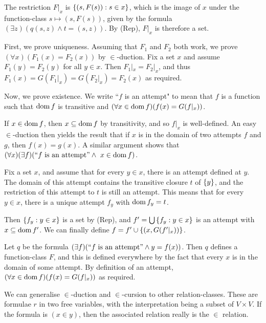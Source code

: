\documentclass{article}
\begin{document}
\begin{prf}
    The restriction $F|_x$ is $\left\lbrace (s, F(s)) : s \in x \right\rbrace$, which is the image of $x$ under the function-class $s \mapsto (s, F(s))$, given by the formula $(\exists z)(q(s, z) \land t = (s, z))$. By (Rep), $F|_x$ is therefore a set.
    
    First, we prove uniqueness. Assuming that $F_1$ and $F_2$ both work, we prove $(\forall x)(F_1(x) = F_2(x))$ by $\in$-duction. Fix a set $x$ and assume $F_1(y) = F_2(y)$ for all $y \in x$. Then $F_1|_x = F_2|_x$, and thus $F_1(x) = G(F_1|_x) = G(F_2|_x) = F_2(x)$ as required.
    
    Now, we prove existence. We write ``$f$ is an attempt" to mean that $f$ is a function such that $\operatorname{dom} f$ is transitive and $(\forall x \in \operatorname{dom} f)(f(x) = G(f|_x))$.
    
    If $x \in \operatorname{dom} f$, then $x \subseteq \operatorname{dom} f$ by transitivity, and so $f|_x$ is well-defined. An easy $\in$-duction then yields the result that if $x$ is in the domain of two attempts $f$ and $g$, then $f(x) = g(x)$. A similar argument shows that $(\forall x)(\exists f)(``f \text{ is an attempt}" \land x \in \dom f)$.
    
    Fix a set $x$, and assume that for every $y \in x$, there is an attempt defined at $y$. The domain of this attempt contains the transitive closure $t$ of $\left\lbrace y \right\rbrace$, and the restriction of this attempt to $t$ is still an attempt. This means that for every $y \in x$, there is a unique attempt $f_y$ with $\operatorname{dom} f_y = t$.
    
    Then $\left\lbrace f_y : y \in x \right\rbrace$ is a set by (Rep), and $f' = \bigcup \left\lbrace f_y : y \in x \right\rbrace$ is an attempt with $x \subseteq \operatorname{dom} f'$. We can finally define $f = f' \cup \left\lbrace (x, G(f'|_x)) \right\rbrace$.
    
    Let $q$ be the formula $(\exists f)(``f \text{ is an attempt}" \land y = f(x))$. Then $q$ defines a function-class $F$, and this is defined everywhere by the fact that every $x$ is in the domain of some attempt. By definition of an attempt, $(\forall x \in \operatorname{dom} f)(f(x) = G(f|_x))$ as required.
\end{prf}

\begin{note}
	We can generalise $\in$-duction and $\in$-cursion to other relation-classes. These are formulae $r$ in two free variables, with the interpretation being a subset of $V \times V$. If the formula is $(x \in y)$, then the associated relation really is the $\in$ relation.
\end{note}
\end{document}
